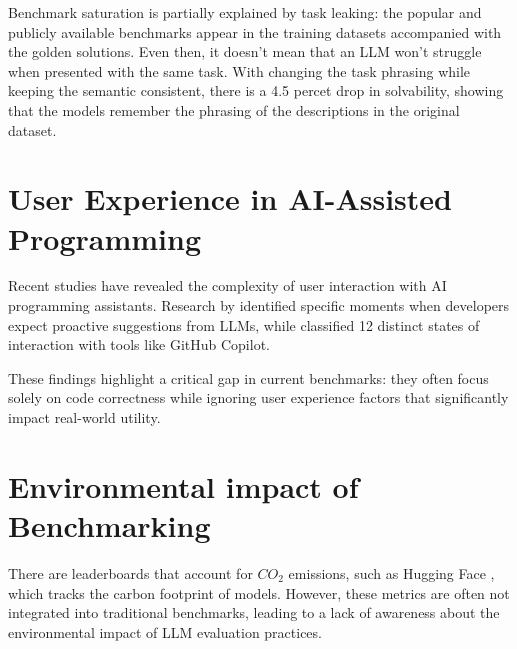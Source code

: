 Benchmark saturation is partially explained by task leaking: the popular and publicly available benchmarks appear in the training datasets accompanied with the golden solutions. Even then, it doesn't mean that an LLM won't struggle when presented with the same task. With changing the task phrasing while keeping the semantic consistent, there is a 4.5 percet drop in solvability, showing that the models remember the phrasing of the descriptions in the original dataset. \cite{uniyal2024one}


\section{User Experience in AI-Assisted Programming}

Recent studies have revealed the complexity of user interaction with AI programming assistants. Research by \cite{chen2025needhelpdesigningproactive} identified specific moments when developers expect proactive suggestions from LLMs, while \cite{mozannar2024readinglinesmodelinguser} classified 12 distinct states of interaction with tools like GitHub Copilot.

These findings highlight a critical gap in current benchmarks: they often focus solely on code correctness while ignoring user experience factors that significantly impact real-world utility.


\section{Environmental impact of Benchmarking}


There are leaderboards that account for $CO_2$ emissions, such as Hugging Face \cite{huggingfaceCalculation}, which tracks the carbon footprint of models. However, these metrics are often not integrated into traditional benchmarks, leading to a lack of awareness about the environmental impact of LLM evaluation practices.


